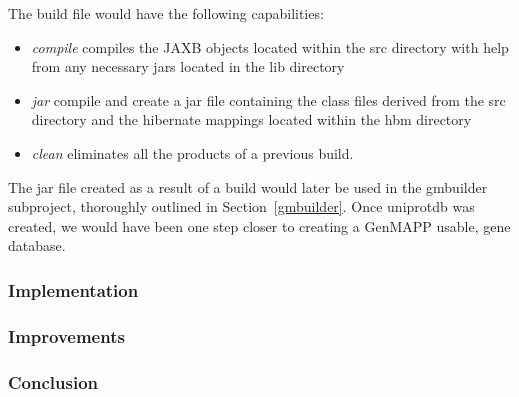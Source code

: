 The build file would have the following capabilities:
\begin{itemize}
  \item \textit{compile} compiles the JAXB objects located within the src directory with help from any necessary jars located in the lib directory

  \item \textit{jar} compile and create a jar file containing the class files derived from the src directory and the hibernate mappings located within the hbm directory
  
  \item \textit{clean} eliminates all the products of a previous build.  
\end{itemize}

The jar file created as a result of a build would later be used in the gmbuilder 
subproject, thoroughly outlined in Section~\ref{gmbuilder}.  Once uniprotdb was
created, we would have been one step closer to creating a GenMAPP usable, gene 
database.  

\subsubsection{Implementation}

\subsubsection{Improvements}

\subsubsection{Conclusion}
 
